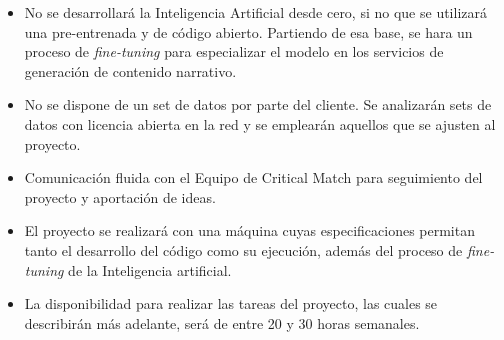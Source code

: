 \documentclass[
11pt, %
]{Clases/charter}
\begin{document}
\begin{itemize}
	\item No se desarrollará la Inteligencia Artificial desde cero, si no que se utilizará una pre-entrenada y de código abierto.
	      Partiendo de esa base, se hara un proceso de \textit{fine-tuning} para especializar el modelo en los servicios de generación de contenido narrativo.
	\item No se dispone de un set de datos por parte del cliente.
	      Se analizarán sets de datos con licencia abierta en la red y se emplearán aquellos que se ajusten al proyecto.
	\item Comunicación fluida con el Equipo de Critical Match para seguimiento del proyecto y aportación de ideas.
	\item El proyecto se realizará con una máquina cuyas especificaciones permitan tanto el desarrollo del código como su ejecución, además del proceso de \textit{fine-tuning} de la Inteligencia artificial.
	\item La disponibilidad para realizar las tareas del proyecto, las cuales se describirán más adelante, será de entre 20 y 30 horas semanales.
\end{itemize}
\end{document}
